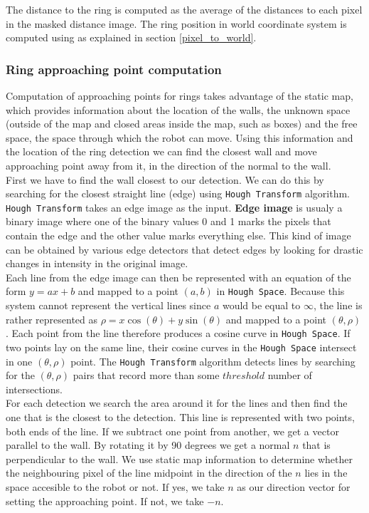 \documentclass[12pt,a4paper]{article}
\begin{document}
	The distance to the ring is computed as the average of the distances to each pixel in the masked distance image. The ring position in world coordinate system is computed using as explained in section \ref{pixel_to_world}. \\

	\subsubsection{Ring approaching point computation}
	Computation of approaching points for rings takes advantage of the static map, which provides information about the location of the walls, the unknown space (outside of the map and closed areas inside the map, such as boxes) and the free space, the space through which the robot can move. Using this information and the location of the ring detection we can find the closest wall and move approaching point away from it, in the direction of the normal to the wall. \\

	First we have to find the wall closest to our detection. We can do this by searching for the closest straight line (edge) using \texttt{Hough Transform} algorithm. \texttt{Hough Transform} takes an edge image as the input. \textbf{Edge image} is usualy a binary image where one of the binary values 0 and 1 marks the pixels that contain the edge and the other value marks everything else. This kind of image can be obtained by various edge detectors that detect edges by looking for drastic changes in intensity in the original image. \\
	
	Each line from the edge image can then be represented with an equation of the form $y = ax + b$ and mapped to a point $(a, b)$ in \texttt{Hough Space}. Because this system cannot represent the vertical lines since $a$ would be equal to $\infty$, the line is rather represented as $\rho = x\cos(\theta) + y\sin(\theta)$ and mapped to a point $(\theta, \rho)$. Each point from the line therefore produces a cosine curve in \texttt{Hough Space}. If two points lay on the same line, their cosine curves in the \texttt{Hough Space} intersect in one $(\theta, \rho)$ point. The \texttt{Hough Transform} algorithm detects lines by searching for the $(\theta, \rho)$ pairs that record more than some $threshold$ number of intersections. \\

	For each detection we search the area around it for the lines and then find the one that is the closest to the detection. This line is represented with two points, both ends of the line. If we subtract one point from another, we get a vector parallel to the wall. By rotating it by 90 degrees we get a normal $n$ that is perpendicular to the wall. We use static map information to determine whether the neighbouring pixel of the line midpoint in the direction of the $n$ lies in the space accesible to the robot or not. If yes, we take $n$ as our direction vector for setting the approaching point. If not, we take $-n$. \\
\end{document}
